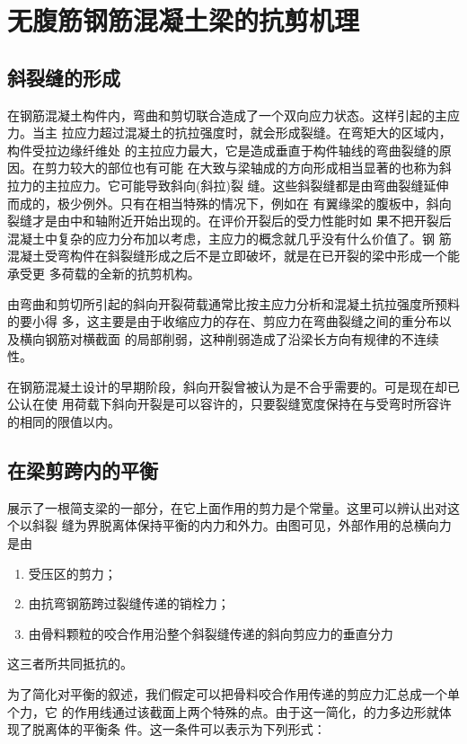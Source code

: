 \documentclass[12pt,a4paper]{book}
\begin{document}
\section{无腹筋钢筋混凝土梁的抗剪机理}

\subsection{斜裂缝的形成}

在钢筋混凝土构件内，弯曲和剪切联合造成了一个双向应力状态。这样引起的主应力。当主
拉应力超过混凝土的抗拉强度时，就会形成裂缝。在弯矩大的区域内，构件受拉边缘纤维处
的主拉应力最大，它是造成垂直于构件轴线的弯曲裂缝的原因。在剪力较大的部位也有可能
在大致与梁轴成的方向形成相当显著的也称为斜拉力的主拉应力。它可能导致斜向(斜拉)裂
缝。这些斜裂缝都是由弯曲裂缝延伸而成的，极少例外。只有在相当特殊的情况下，例如在
有翼缘梁的腹板中，斜向裂缝才是由中和轴附近开始出现的。在评价开裂后的受力性能时如
果不把开裂后混凝土中复杂的应力分布加以考虑，主应力的概念就几乎没有什么价值了。钢
筋混凝土受弯构件在斜裂缝形成之后不是立即破坏，就是在已开裂的梁中形成一个能承受更
多荷载的全新的抗剪机构。

由弯曲和剪切所引起的斜向开裂荷载通常比按主应力分析和混凝土抗拉强度所预料的要小得
多，这主要是由于收缩应力的存在、剪应力在弯曲裂缝之间的重分布以及横向钢筋对横截面
的局部削弱，这种削弱造成了沿梁长方向有规律的不连续性。

在钢筋混凝土设计的早期阶段，斜向开裂曾被认为是不合乎需要的。可是现在却已公认在使
用荷载下斜向开裂是可以容许的，只要裂缝宽度保持在与受弯时所容许的相同的限值以内。

\subsection{在梁剪跨内的平衡}

展示了一根简支梁的一部分，在它上面作用的剪力是个常量。这里可以辨认出对这个以斜裂
缝为界脱离体保持平衡的内力和外力。由图可见，外部作用的总横向力是由
\begin{enumerate}
\item 受压区的剪力；
\item 由抗弯钢筋跨过裂缝传递的销栓力；
\item 由骨料颗粒的咬合作用沿整个斜裂缝传递的斜向剪应力的垂直分力
\end{enumerate}
这三者所共同抵抗的。

为了简化对平衡的叙述，我们假定可以把骨料咬合作用传递的剪应力汇总成一个单个力，它
的作用线通过该截面上两个特殊的点。由于这一简化，的力多边形就体现了脱离体的平衡条
件。这一条件可以表示为下列形式：
\end{document}
